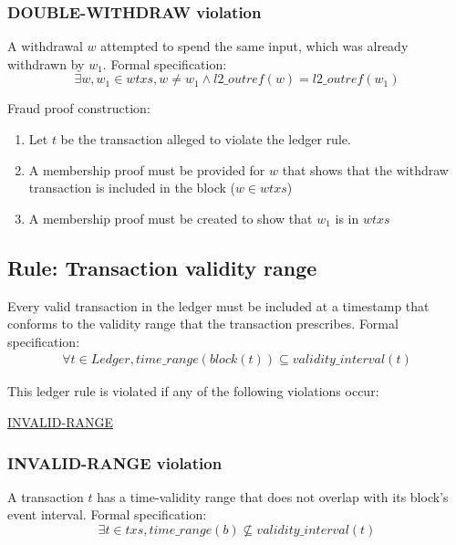\documentclass[../midgard.tex]{subfiles}
\begin{document}
\subsubsection{DOUBLE-WITHDRAW violation}
\label{violation:DOUBLE-WITHDRAW}
A withdrawal $w$ attempted to spend the same input, which was already withdrawn by $w_1$.
Formal specification:
\begin{equation*}
    \exists w, w_1 \in wtxs, w \neq w_1 \land l2\_outref(w) = l2\_outref(w_1)
\end{equation*}

Fraud proof construction:
\begin{enumerate}
  \item Let $t$ be the transaction alleged to violate the ledger rule. 
  \item A membership proof must be provided for $w$ that shows that the withdraw transaction is included in the block ($w \in wtxs$)
  \item A membership proof must be created to show that $w_1$ is in $wtxs$
\end{enumerate}

\subsection{Rule: Transaction validity range}
\label{rule:transaction-validity-range}
Every valid transaction in the ledger must be included at a timestamp that conforms to the validity range that the transaction prescribes.
Formal specification:
\begin{equation*}
\begin{split}
    \forall t \in Ledger, time\_range(block(t)) \subseteq validity\_interval(t)
\end{split}
\end{equation*}

This ledger rule is violated if any of the following violations occur:
\begin{itemize-multi}
  \item \hyperref[violation:INVALID-RANGE]{INVALID-RANGE}
\end{itemize-multi}

\subsubsection{INVALID-RANGE violation}
\label{violation:INVALID-RANGE}
A transaction $t$ has a time-validity range that does not overlap with its block's event interval. 
Formal specification:
\begin{equation*}
    \exists t \in txs, time\_range(b) \nsubseteq validity\_interval(t)
\end{equation*}
\end{document}
